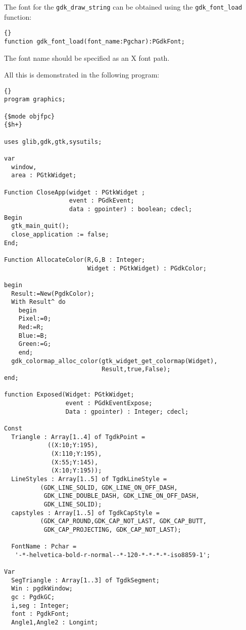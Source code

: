 \documentclass[10pt]{article}
\newcommand{\var}[1]{\texttt{#1}}
\begin{document}
The font for the \var{gdk\_draw\_string} can be obtained using the
\var{gdk\_font\_load} function:
\begin{lstlisting}{}
function gdk_font_load(font_name:Pgchar):PGdkFont;
\end{lstlisting}{}
The font name should be specified as an X font path.

All this is demonstrated in the following program:
\begin{lstlisting}{}
program graphics;

{$mode objfpc}
{$h+}

uses glib,gdk,gtk,sysutils;

var 
  window, 
  area : PGtkWidget;

Function CloseApp(widget : PGtkWidget ;
                  event : PGdkEvent;
                  data : gpointer) : boolean; cdecl;
Begin
  gtk_main_quit();
  close_application := false;
End;

Function AllocateColor(R,G,B : Integer; 
                       Widget : PGtkWidget) : PGdkColor;

begin
  Result:=New(PgdkColor);
  With Result^ do
    begin
    Pixel:=0;
    Red:=R;
    Blue:=B;
    Green:=G;  
    end;
  gdk_colormap_alloc_color(gtk_widget_get_colormap(Widget),
                           Result,true,False);
end;

function Exposed(Widget: PGtkWidget;
                 event : PGdkEventExpose; 
                 Data : gpointer) : Integer; cdecl;

Const 
  Triangle : Array[1..4] of TgdkPoint = 
            ((X:10;Y:195),
             (X:110;Y:195),
             (X:55;Y:145),
             (X:10;Y:195));
  LineStyles : Array[1..5] of TgdkLineStyle = 
          (GDK_LINE_SOLID, GDK_LINE_ON_OFF_DASH, 
           GDK_LINE_DOUBLE_DASH, GDK_LINE_ON_OFF_DASH, 
           GDK_LINE_SOLID);
  capstyles : Array[1..5] of TgdkCapStyle = 
          (GDK_CAP_ROUND,GDK_CAP_NOT_LAST, GDK_CAP_BUTT,
           GDK_CAP_PROJECTING, GDK_CAP_NOT_LAST);

  FontName : Pchar = 
   '-*-helvetica-bold-r-normal--*-120-*-*-*-*-iso8859-1';
          
Var
  SegTriangle : Array[1..3] of TgdkSegment;
  Win : pgdkWindow;
  gc : PgdkGC;
  i,seg : Integer; 
  font : PgdkFont;
  Angle1,Angle2 : Longint;
    

\end{lstlisting}
\end{document}
